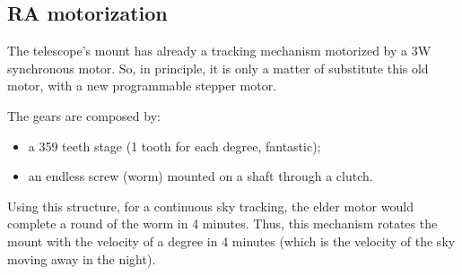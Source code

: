 \documentclass{article}
\begin{document}
\begin{multicols}{2}
        \subsection{RA motorization}
        The telescope's mount has already a tracking mechanism motorized by a 3W synchronous motor.
        So, in principle, it is only a matter of substitute this old motor, with a new programmable stepper motor.

        The gears are composed by:
        \begin{itemize}
            \item a 359 teeth stage (1 tooth for each degree, fantastic);
            \item an endless screw (worm) mounted on a shaft through a clutch.
        \end{itemize}
        Using this structure, for a continuous sky tracking, the elder motor would complete a round of the worm in 4 minutes.
        Thus, this mechanism rotates the mount with the velocity of a degree in 4 minutes (which is the velocity of the sky moving away in the night).


\end{multicols}
\end{document}
